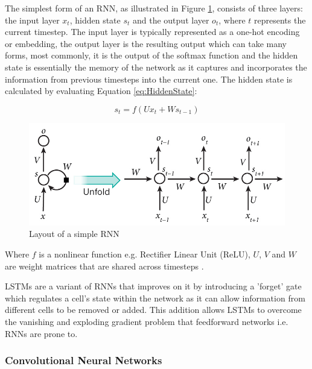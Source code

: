 \documentclass[a4paper,twoside,phd]{BYUPhys}
\begin{document}
The simplest form of an RNN, as illustrated in Figure \ref{fig:RNN}, consists of three layers: the input layer $x_t$, hidden state $s_t$ and the output layer $o_t$, where $t$ represents the current timestep. The input layer is typically represented as a one-hot encoding or embedding, the output layer is the resulting output which can take many forms, most commonly, it is the output of the softmax function and the hidden state is essentially the memory of the network as it captures and incorporates the information from previous timesteps into the current one. The hidden state is calculated by evaluating Equation \ref{eq:HiddenState}:

\begin{equation}
s_t = f(Ux_t + Ws_{t-1})
\label{eq:HiddenState}
\end{equation}

\begin{figure}[H]
	\centering
	\includegraphics[totalheight=6cm]{images/RNN.jpg}
	\caption{Layout of a simple RNN \cite{RNNDiagram}}
	\label{fig:RNN}
\end{figure}

Where $f$ is a nonlinear function e.g. Rectifier Linear Unit (ReLU), $U$, $V$ and $W$ are weight matrices that are shared across timesteps \cite{Young}. \newline

LSTMs \cite{Hochreiter1997} are a variant of RNNs that improves on it by introducing a 'forget' gate which regulates a cell's state within the network as it can allow information from different cells to be removed or added. This addition allows LSTMs to overcome the vanishing and exploding gradient problem \cite{Socher} that feedforward networks i.e. RNNs are prone to.

\subsubsection{Convolutional Neural Networks}
\label{sec:CNN}
\end{document}
